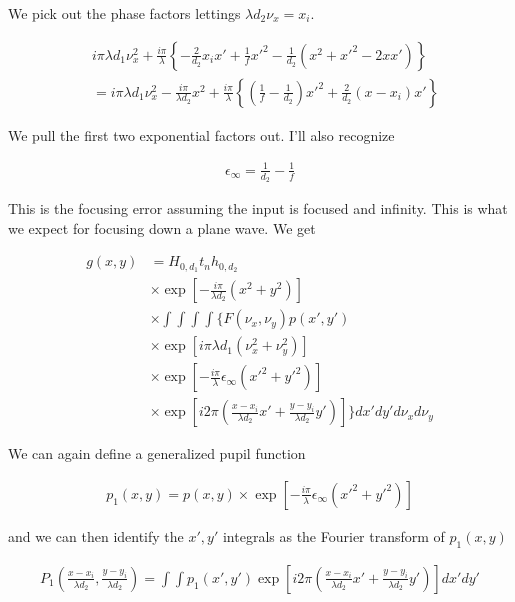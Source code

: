 \documentclass[12pt]{article}
\begin{document}
We pick out the phase factors lettings $\lambda d_2 \nu_x = x_i$.

\begin{align}
&i\pi\lambda d_1 \nu_x^2 + \frac{i\pi}{\lambda}\left\{-\frac{2}{d_2}x_ix' + \frac{1}{f}x'^2 - \frac{1}{d_2}(x^2+x'^2-2xx') \right\}\\
&= i\pi\lambda d_1 \nu_x^2 -\frac{i\pi}{\lambda d_2} x^2 + \frac{i\pi}{\lambda}\left\{\left(\frac{1}{f}-\frac{1}{d_2}\right)x'^2 + \frac{2}{d_2}(x-x_i)x' \right\}
\end{align}

We pull the first two exponential factors out. I'll also recognize

\begin{align}
\epsilon_{\infty} = \frac{1}{d_2}-\frac{1}{f}
\end{align}

This is the focusing error assuming the input is focused and infinity. This is what we expect for focusing down a plane wave. We get

\begin{align}
g(x,y) &= H_{0,d_1} t_n h_{0,d_2}\\
&\times \exp\left[-\frac{i\pi}{\lambda d_2}(x^2+y^2)\right]\\
&\times \int \int \int \int \Bigg\{F(\nu_x,\nu_y) p(x',y')\\
&\times \exp\left[i\pi \lambda d_1 (\nu_x^2+\nu_y^2) \right]\\
&\times \exp\left[-\frac{i\pi}{\lambda}\epsilon_{\infty}(x'^2+y'^2)\right]\\
&\times \exp\left[i2\pi \left(\frac{x-x_i}{\lambda d_2}x' + \frac{y-y_i}{\lambda d_2}y'\right)\right]\Bigg\} dx'dy'd\nu_xd\nu_y
\end{align}

We can again define a generalized pupil function

\begin{align}
p_1(x,y) = p(x,y)\times \exp\left[-\frac{i\pi}{\lambda}\epsilon_{\infty}(x'^2+y'^2)\right]
\end{align}

and we can then identify the $x', y'$ integrals as the Fourier transform of $p_1(x,y)$

\begin{align}
P_1\left(\frac{x-x_i}{\lambda d_2},\frac{y-y_i}{\lambda d_2}\right) = \int\int p_1(x',y') \exp\left[i2\pi \left(\frac{x-x_i}{\lambda d_2}x' + \frac{y-y_i}{\lambda d_2}y'\right)\right] dx'dy'
\end{align}
\end{document}
